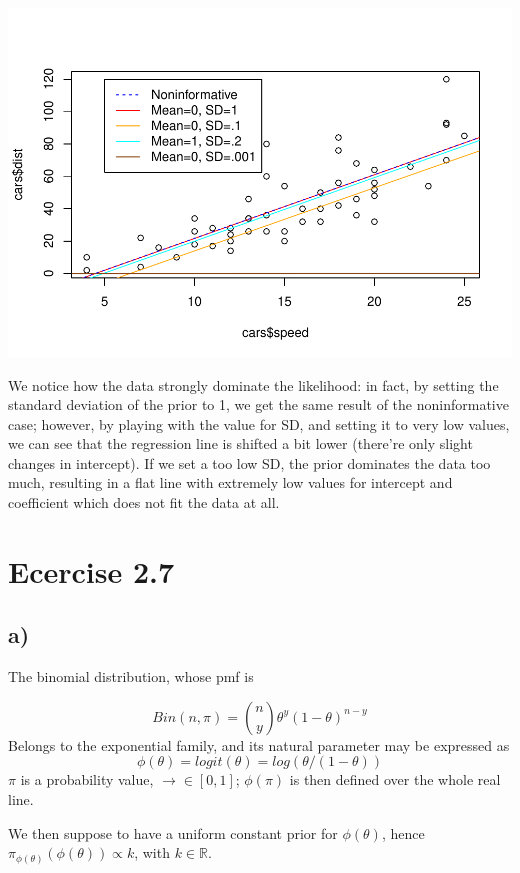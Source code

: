 \documentclass[]{article}
\begin{document}
\includegraphics{ex01_files/figure-latex/unnamed-chunk-2-1.pdf}

We notice how the data strongly dominate the likelihood: in fact, by
setting the standard deviation of the prior to 1, we get the same result
of the noninformative case; however, by playing with the value for SD,
and setting it to very low values, we can see that the regression line
is shifted a bit lower (there're only slight changes in intercept). If
we set a too low SD, the prior dominates the data too much, resulting in
a flat line with extremely low values for intercept and coefficient
which does not fit the data at all.

\section{Ecercise 2.7}\label{ecercise-2.7}

\subsection{a)}\label{a}

The binomial distribution, whose pmf is

\[
Bin(n,\pi) = \binom{n}{y}\theta^y(1-\theta)^{n-y}
\] Belongs to the exponential family, and its natural parameter may be
expressed as \[
\phi(\theta) = logit(\theta) = log(\theta/(1-\theta))
\] \(\pi\) is a probability value, \(\rightarrow \in [0,1]\);
\(\phi(\pi)\) is then defined over the whole real line.

We then suppose to have a uniform constant prior for \(\phi(\theta)\),
hence \(\pi_{\phi(\theta)}(\phi(\theta)) \propto k\), with
\(k \in \mathbb{R}\).
\end{document}
